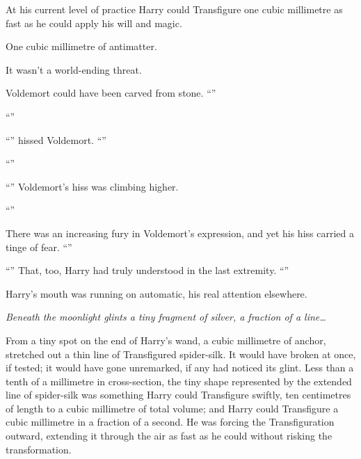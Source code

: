 At his current level of practice Harry could Transfigure one cubic millimetre as fast as he could apply his will and magic.

One cubic millimetre of antimatter.

It wasn’t a world-ending threat.

Voldemort could have been carved from stone. “”

“”

“” hissed Voldemort. “”

“”

“” Voldemort’s hiss was climbing higher.

“”

There was an increasing fury in Voldemort’s expression, and yet his hiss carried a tinge of fear. “”

“” That, too, Harry had truly understood in the last extremity. “”

Harry’s mouth was running on automatic, his real attention elsewhere.

\emph{Beneath the moonlight glints a tiny fragment of silver, a fraction of a line…}

From a tiny spot on the end of Harry’s wand, a cubic millimetre of anchor, stretched out a thin line of Transfigured spider-silk. It would have broken at once, if tested; it would have gone unremarked, if any had noticed its glint. Less than a tenth of a millimetre in cross-section, the tiny shape represented by the extended line of spider-silk was something Harry could Transfigure swiftly, ten centimetres of length to a cubic millimetre of total volume; and Harry could Transfigure a cubic millimetre in a fraction of a second. He was forcing the Transfiguration outward, extending it through the air as fast as he could without risking the transformation.

